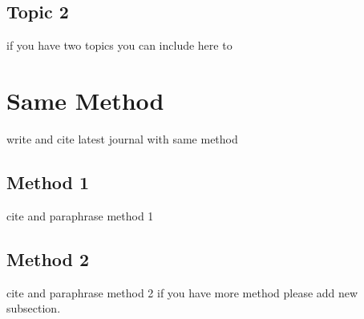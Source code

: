 \subsection{Topic 2}
if you have two topics you can include here to


\section{Same Method}
write and cite latest journal with same method

\subsection{Method 1}
cite and paraphrase method 1

\subsection{Method 2}
cite and paraphrase method 2 if you have more method please add new subsection.

 